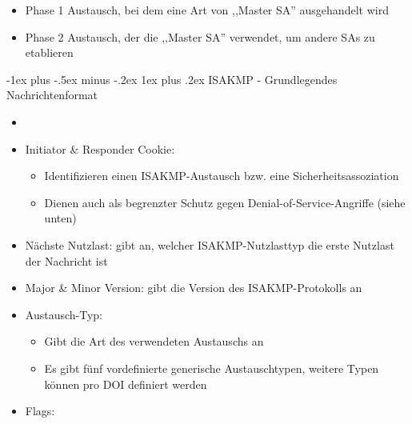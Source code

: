 \documentclass[a4paper]{article}
\makeatletter
\renewcommand{\subsubsection}{\@startsection{subsubsection}{3}{0mm}%
 {-1ex plus -.5ex minus -.2ex}%
 {1ex plus .2ex}%
 {\normalfont\small\bfseries}}
\makeatother
\begin{document}
\begin{multicols}{3}
\begin{itemize}
              \begin{itemize}
                  \item
                        Phase 1 Austausch, bei dem eine Art von ,,Master SA'' ausgehandelt
                        wird
                  \item
                        Phase 2 Austausch, der die ,,Master SA'' verwendet, um andere SAs zu
                        etablieren
              \end{itemize}
    \end{itemize}


    \subsubsection{ISAKMP - Grundlegendes
        Nachrichtenformat}

    \begin{itemize}
        \item
        \item
              Initiator \& Responder Cookie:

              \begin{itemize}
                  \item
                        Identifizieren einen ISAKMP-Austausch bzw. eine
                        Sicherheitsassoziation
                  \item
                        Dienen auch als begrenzter Schutz gegen Denial-of-Service-Angriffe
                        (siehe unten)
              \end{itemize}
        \item
              Nächste Nutzlast: gibt an, welcher ISAKMP-Nutzlasttyp die erste
              Nutzlast der Nachricht ist
        \item
              Major \& Minor Version: gibt die Version des ISAKMP-Protokolls an
        \item
              Austausch-Typ:

              \begin{itemize}
                  \item
                        Gibt die Art des verwendeten Austauschs an
                  \item
                        Es gibt fünf vordefinierte generische Austauschtypen, weitere Typen
                        können pro DOI definiert werden
              \end{itemize}
        \item
              Flags:


\end{itemize}
\end{multicols}
\end{document}
